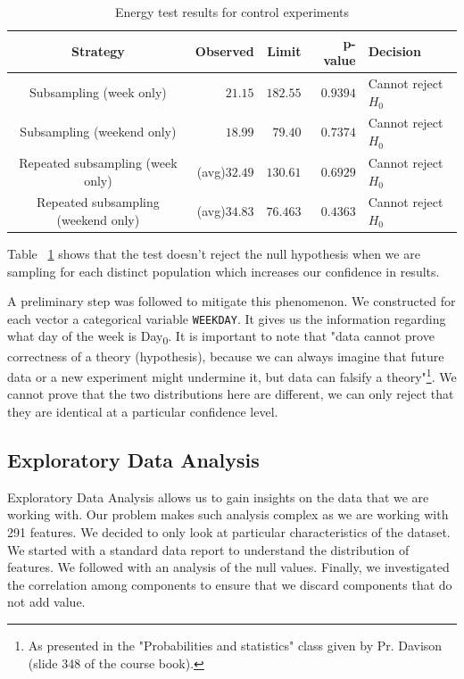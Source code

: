 \begin{table}[h]
\begin{center}
\begin{tabular}{c r r r l}
\hline
\textbf{Strategy} & \textbf{Observed} & \textbf{Limit} & \textbf{p-value} & \textbf{Decision}\\ 
\hline\hline
Subsampling (week only) &  $21.15$ & $182.55$ & $0.9394$ & Cannot reject $H_0$\\
\hline
Subsampling (weekend only) &  $18.99$ & $79.40$ & $0.7374$ & Cannot reject $H_0$\\
\hline\hline
Repeated subsampling (week only) & (avg)$32.49$ & $130.61$ & $0.6929$ & Cannot reject $H_0$\\
\hline
Repeated subsampling (weekend only) & (avg)$34.83$ & $76.463$ & $0.4363$ & Cannot reject $H_0$\\
\end{tabular}
\end{center}
\caption{\label{hyp_test_control}Energy test results for control experiments}
\end{table}

Table ~\ref{hyp_test_control} shows that the test doesn't reject the null hypothesis when we are sampling for each distinct population which increases our confidence in results. 

\vspace{1\baselineskip}A preliminary step was followed to mitigate this phenomenon. We constructed for each vector a categorical variable \texttt{WEEKDAY}. It gives us the information regarding what day of the week is Day\textsubscript{0}. It is important to note that "data cannot prove correctness of a theory (hypothesis), because we can always imagine that future data or a new experiment might undermine it, but data can falsify a theory"\footnote{As presented in the "Probabilities and statistics" class given by Pr. Davison (slide 348 of the course book).}. We cannot prove that the two distributions here are different, we can only reject that they are identical at a particular confidence level. 

\subsection{Exploratory Data Analysis}
Exploratory Data Analysis allows us to gain insights on the data that we are working with. Our problem makes such analysis complex as we are working with 291 features. We decided to only look at particular characteristics of the dataset. We started with a standard data report to understand the distribution of features. We followed with an analysis of the null values. Finally, we investigated the correlation among components to ensure that we discard components that do not add value. 

